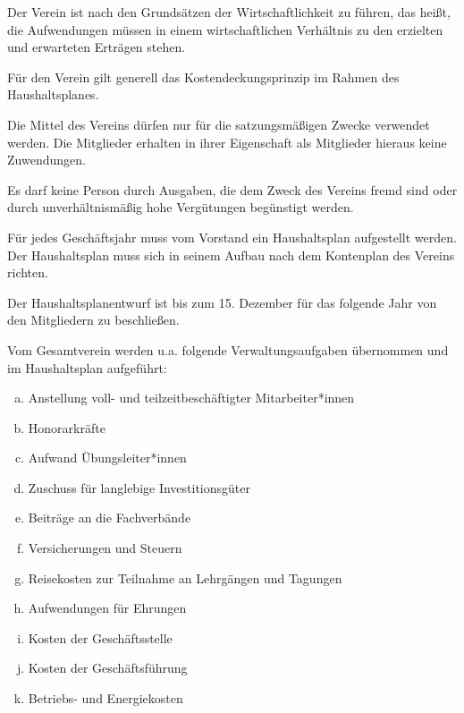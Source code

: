 \begin{finanz}


  Der Verein ist nach den Grundsätzen der Wirtschaftlichkeit zu führen, das hei\ss{}t, die Aufwendungen müssen in einem wirtschaftlichen Verhältnis zu den erzielten und erwarteten Erträgen stehen.

  Für den Verein gilt generell das Kostendeckungsprinzip im Rahmen des Haushaltsplanes.

  Die Mittel des Vereins dürfen nur für die satzungsmä\ss{}igen Zwecke verwendet werden. Die Mitglieder erhalten in ihrer Eigenschaft als Mitglieder hieraus keine Zuwendungen.

  Es darf keine Person durch Ausgaben, die dem Zweck des Vereins fremd sind oder durch unverhältnismä\ss{}ig hohe Vergütungen begünstigt werden.

  \label{haushaltsplan}

  Für jedes Geschäftsjahr muss vom Vorstand ein Haushaltsplan aufgestellt werden. Der Haushaltsplan muss sich in seinem Aufbau nach dem Kontenplan des Vereins richten.

  Der Haushaltsplanentwurf ist bis zum 15. Dezember für das folgende Jahr von den Mitgliedern zu beschlie\ss{}en.

  Vom Gesamtverein werden u.a. folgende Verwaltungsaufgaben übernommen und im Haushaltsplan aufgeführt:
  \begin{enumerate}[(a)]
    \item Anstellung voll- und teilzeitbeschäftigter Mitarbeiter*innen
    \item Honorarkräfte
    \item Aufwand Übungsleiter*innen
    \item Zuschuss für langlebige Investitionsgüter
    \item Beiträge an die Fachverbände
    \item Versicherungen und Steuern
    \item Reisekosten zur Teilnahme an Lehrgängen und Tagungen
    \item Aufwendungen für Ehrungen
    \item Kosten der Geschäftsstelle
    \item Kosten der Geschäftsführung
    \item Betriebs- und Energiekosten
  \end{enumerate}


\end{finanz}
